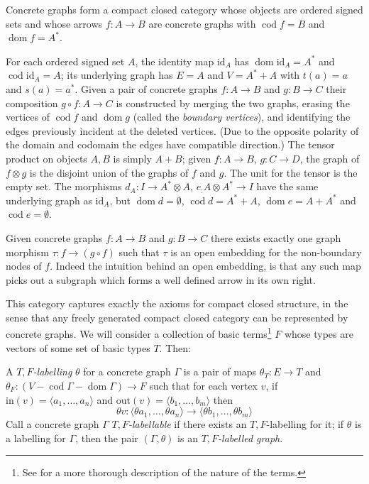 \documentclass[runningheads]{llncs}
\newcommand{\dom}{\operatorname{dom}}
\newcommand{\cod}{\operatorname{cod}}
\newcommand{\id}[1]{\ensuremath{\mathrm{id}_{#1}}}
\begin{document}
\begin{proposition}
Concrete graphs form a compact closed category whose objects are
ordered signed sets and whose arrows $f:A\to B$ are concrete graphs with
$\cod f = B$  and $\dom f = A^*$.
\end{proposition}
For each ordered signed set $A$, the identity map $\id{A}$ has $\dom
\id{A} = A^*$ and $\cod \id{A} = A$; its underlying graph has $E = A$
and $V = A^* + A$ with $t(a) = a$ and $s(a) = a^*$.  Given a pair of
concrete graphs $f:A\to B$ and $g:B\to C$ their composition $g\circ
f:A\to C$ is constructed by merging the two graphs, erasing the
vertices of $\cod f$ and $\dom g$ (called the \emph{boundary
  vertices}), and identifying the edges previously incident at the
deleted vertices.  (Due to the opposite polarity of the domain and
codomain the edges have compatible direction.)  The tensor product on
objects $A,B$ is simply $A+B$; given $f:A\to B$, $g: C\to D$, the
graph of $f \otimes g$ is the disjoint union of the graphs of $f$ and
$g$.  The unit for the tensor is the empty set.  The morphisms $d_A :
I \to A^* \otimes A$, $e_: A \otimes A^* \to I$ have the same
underlying graph as $\id{A}$, but $\dom d = \emptyset$, $\cod d = A^*+A$, $\dom e
= A+A^*$ and $\cod e = \emptyset$.

\begin{remark}
  Given concrete graphs $f : A\to B$ and $g:B\to C$ there exists
  exactly one graph morphism  $\tau:  f \to (g\circ f)$ such that
  $\tau$ is an open embedding for the non-boundary nodes
  of $f$.   Indeed the intuition behind an open embedding, is that any
  such map picks out a subgraph which forms a well defined arrow in
  its own right.
\end{remark}

This category captures exactly the axioms for compact closed
structure, in the sense that any freely generated compact closed
category can be represented by concrete graphs.  We will consider
a collection of basic terms\footnote{See \cite{Duncan:thesis:2006} for
  a more thorough description of the nature of the terms.} $F$
whose types are vectors of some set of basic types $T$.  Then:

\begin{definition}
  A \emph{$T,F$-labelling} $\theta$ for a concrete graph $\Gamma$ is a pair of
  maps  $\theta_T : E \to T$ and $\theta_F : (V - \cod\Gamma -
  \dom\Gamma) \to F$  such that for each vertex  $v$, if
  $\text{in}(v) = \langle a_1, \ldots, a_n\rangle$ and $\text{out}(v)
  = \langle b_1, \ldots, b_m\rangle$ then 
  \[
  \theta v : \langle \theta a_1, \ldots, \theta a_n \rangle
  \to 
  \langle \theta b_1, \ldots, \theta b_m \rangle
  \]
  Call a concrete graph $\Gamma$ \emph{$T,F$-labellable} if there exists an 
  $T,F$-labelling for it; if $\theta$ is a labelling for $\Gamma$, then
 the pair $(\Gamma,\theta)$ is an \emph{$T,F$-labelled graph}.
\end{definition}
\end{document}
